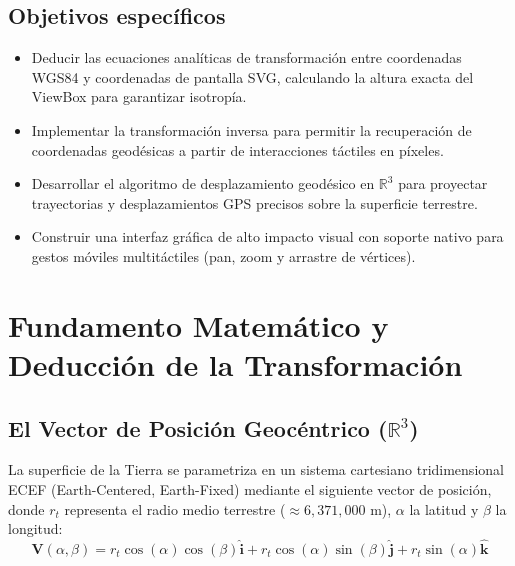 \documentclass[12pt,a4paper]{article}
\begin{document}
\subsection{Objetivos específicos}
\begin{itemize}
    \item Deducir las ecuaciones analíticas de transformación entre coordenadas WGS84 y coordenadas de pantalla SVG, calculando la altura exacta del ViewBox para garantizar isotropía.
    \item Implementar la transformación inversa para permitir la recuperación de coordenadas geodésicas a partir de interacciones táctiles en píxeles.
    \item Desarrollar el algoritmo de desplazamiento geodésico en $\mathbb{R}^3$ para proyectar trayectorias y desplazamientos GPS precisos sobre la superficie terrestre.
    \item Construir una interfaz gráfica de alto impacto visual con soporte nativo para gestos móviles multitáctiles (pan, zoom y arrastre de vértices).
\end{itemize}


\section{Fundamento Matemático y Deducción de la Transformación}

\subsection{El Vector de Posición Geocéntrico ($\mathbb{R}^3$)}

La superficie de la Tierra se parametriza en un sistema cartesiano tridimensional ECEF (Earth-Centered, Earth-Fixed) mediante el siguiente vector de posición, donde $r_t$ representa el radio medio terrestre ($\approx 6,371,000\text{ m}$), $\alpha$ la latitud y $\beta$ la longitud:
\begin{equation}
    \mathbf{V}(\alpha,\beta) = r_t \cos(\alpha)\cos(\beta)\mathbf{\hat{i}} + r_t \cos(\alpha)\sin(\beta)\mathbf{\hat{j}} + r_t \sin(\alpha)\mathbf{\hat{k}}
\end{equation}
\end{document}
